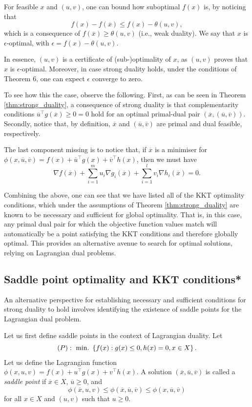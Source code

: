 For feasible $x$ and $(u,v)$, one can bound how suboptimal $f(x)$ is, by noticing that
	$$
		f(x) - f(\overline{x}) \le f(x) - \theta(u,v),
	$$
	which is a consequence of $f(\overline{x}) \ge \theta(u,v)$ (i.e., weak duality). We say that $x$ is $\epsilon$-optimal, with $\epsilon = f(x) - \theta(u,v)$. 

In essence, $(u,v)$ is a certificate of (sub-)optimality of $x$, as $(u,v)$ proves that $x$ is $\epsilon$-optimal. Moreover, in case strong duality holds, under the conditions of Theorem 6, one can expect $\epsilon$ converge to zero.

To see how this the case, observe the following. First, as can be seen in Theorem \ref{thm:strong_duality}, a consequence of strong duality is that complementarity conditions $\overline{u}^\top g(\overline{x}) \geq 0=0$ hold for an optimal primal-dual pair $(\overline{x} , (\overline{u}, \overline{v}))$. Secondly, notice that, by definition, $\overline{x}$ and $(\overline{u}, \overline{v})$ are primal and dual feasible, respectively. 

The last component missing is to notice that, if $\overline{x}$ is a minimiser for $\phi(x,\overline{u},\overline{v}) = f(x)  + \overline{u}^\top g(x) + \overline{v}^\top h(x) $, then we must have
		$$
		\nabla f(\overline{x}) + \sum_{i=1}^m u_i \nabla g_i(\overline{x}) + \sum_{i=1}^{l} v_i \nabla h_i(\overline{x})= 0.
		$$  

Combining the above, one can see that we have listed all of the KKT optimality conditions, which under the assumptions of Theorem \ref{thm:strong_duality} are known to be necessary and sufficient for global optimality. That is, in this case, any primal dual pair for which the objective function values match will automatically be a point satisfying the KKT conditions and therefore globally optimal. This provides an alternative avenue to search for optimal solutions, relying on Lagrangian dual problems. 

\subsection{Saddle point optimality and KKT conditions*}

An alternative perspective for establishing necessary and sufficient conditions for strong duality to hold involves identifying the existence of saddle points for the Lagrangian dual problem.

Let us first define saddle points in the context of Lagrangian duality. Let 
$$
(P) :~ \mathop{\text{min.~}}\left\{ f(x) : g(x) \leq 0, h(x) = 0, x \in X \right \}.
$$ 
Let us define the Lagrangian function $\phi(x,u,v) = f(x)  + u^\top g(x) + v^\top h(x) $. A solution $(\overline{x}, \overline{u}, \overline{v})$ is called a \emph{saddle point} if $\overline{x} \in X$, $\overline{u} \geq 0$, and 
$$ 
\phi(\overline{x},u,v)  \leq \phi(\overline{x}, \overline{u}, \overline{v})  \leq \phi(x,\overline{u}, \overline{v}) 
$$
for all $x \in X$ and  $(u,v)$ such that $u \geq 0$. 

